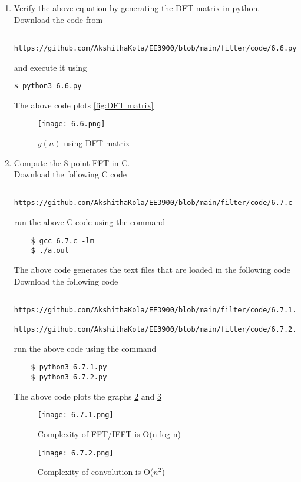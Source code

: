 \documentclass[journal,12pt,twocolumn]{IEEEtran}
\renewcommand\thesection{\arabic{section}}
\begin{document}
\begin{enumerate}[label=\thesection.\arabic*
,ref=\thesection.\theenumi]
\begin{align}
	\mtx{x} = \mathcal{F}^{-1}\brak{\mtx{X}} = \mtx{W}^{-1}\mtx{X} &= \frac{1}{N}\mtx{W^{H}}\mtx{X} = \frac{1}{N}\mtx{X}\mtx{W^{H}} \\ 
	\implies \mtx{W}^{-1} &= \frac{1}{N}\mtx{W^{H}}
\end{align}
\noindent where $H$ denotes hermitian operator. We can rewrite \eqref{6.2} using the element-wise multiplication operator as
\begin{align}
	\mtx{Y} = \mtx{H}\cdot\mtx{X} = \brak{\mtx{W}\mtx{h}}\cdot\brak{\mtx{W}\mtx{x}}
\end{align}
\item Verify the above equation by generating the DFT matrix in python.\\
\solution Download the code from
\begin{lstlisting}
	https://github.com/AkshithaKola/EE3900/blob/main/filter/code/6.6.py
\end{lstlisting}
and execute it using
\begin{lstlisting}
$ python3 6.6.py
\end{lstlisting}
The above code plots \eqref{fig:DFT matrix}
\begin{figure}
\centering
\texttt{[image: 6.6.png]}
\caption{$y(n)$ using DFT matrix}
\label{fig:DFT matrix}
\end{figure}
\item Compute the 8-point FFT in C.\\
\solution Download the following C code 
\begin{lstlisting}
	https://github.com/AkshithaKola/EE3900/blob/main/filter/code/6.7.c
\end{lstlisting}
run the above C code using the command
\begin{lstlisting}
	$ gcc 6.7.c -lm 
	$ ./a.out
\end{lstlisting}
The above code generates the text files that are loaded in the following code \\
Download the following code 
\begin{lstlisting}
	https://github.com/AkshithaKola/EE3900/blob/main/filter/code/6.7.1.py
	https://github.com/AkshithaKola/EE3900/blob/main/filter/code/6.7.2.py
\end{lstlisting}
run the above code using the command
\begin{lstlisting}
	$ python3 6.7.1.py
	$ python3 6.7.2.py
\end{lstlisting}
The above code plots the graphs \ref{fig:complexity fft/ifft} and \ref{fig:Complexity convolution}
\begin{figure}
\centering
\texttt{[image: 6.7.1.png]}
\caption{Complexity of FFT/IFFT is O(n log n)}
\label{fig:complexity fft/ifft}
\end{figure}
\begin{figure}
\centering
\texttt{[image: 6.7.2.png]}
\caption{Complexity of convolution is O($n^2$)}
\label{fig:Complexity convolution}
\end{figure}
\end{enumerate}
\end{document}
